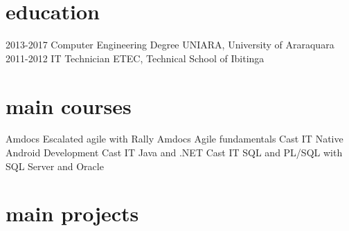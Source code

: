\documentclass[]{friggeri-cv}
\begin{document}
\section{education}

\begin{entrylist}
  \entry
    {2013-2017}
    {Computer Engineering Degree}
    {UNIARA, University of Araraquara}
    { }
  \entry
    {2011-2012}
    {IT Technician {\normalfont}}
    {ETEC, Technical School of Ibitinga}
    {\emph{}}
\end{entrylist}

\section{main courses}

\begin{entrylist}
  \entry
    {Amdocs}
    {Escalated agile with Rally}
    {}
    {\emph{}}
  \entry
    {Amdocs}
    {Agile fundamentals}
    {}
    {\emph{}}
  \entry
    {Cast IT}
    {Native Android Development}
    {}
    {\emph{}}
  \entry
    {Cast IT}
    {Java and .NET}
    {}
    {\emph{}}
   \entry
    {Cast IT}
    {SQL and PL/SQL with SQL Server and Oracle}
    {}
    {\emph{}}
    
\end{entrylist}

\section{main projects}
\end{document}
